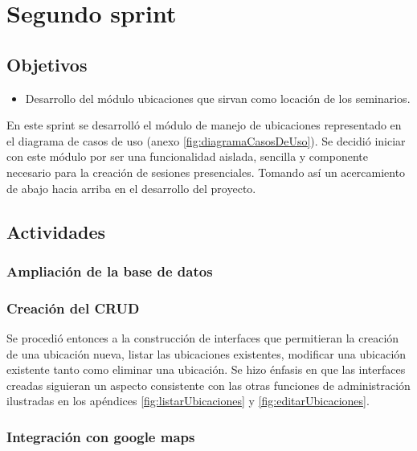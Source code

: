 \section{Segundo sprint} %
\label{sec:segundo_sprint}

\subsection{Objetivos}

\begin{itemize}
	\item Desarrollo del módulo ubicaciones que sirvan como locación de los seminarios.
\end{itemize}

En este sprint se desarrolló el módulo de manejo de ubicaciones representado en el diagrama de casos de uso (anexo \ref{fig:diagramaCasosDeUso}). Se decidió iniciar con este módulo por ser una funcionalidad aislada, sencilla y componente necesario para la creación de sesiones presenciales. Tomando así un acercamiento de abajo hacia arriba en el desarrollo del proyecto.

\subsection{Actividades} %
\label{sub:actividades2}

\subsubsection{Ampliación de la base de datos}

\subsubsection{Creación del CRUD}


Se procedió entonces a la construcción de interfaces que permitieran la creación de una ubicación nueva, listar las ubicaciones existentes, modificar una ubicación existente tanto como eliminar una ubicación. Se hizo énfasis en que las interfaces creadas siguieran un aspecto consistente con las otras funciones de administración ilustradas en los apéndices \ref{fig:listarUbicaciones} y \ref{fig:editarUbicaciones}.

\subsubsection{Integración con google maps}

